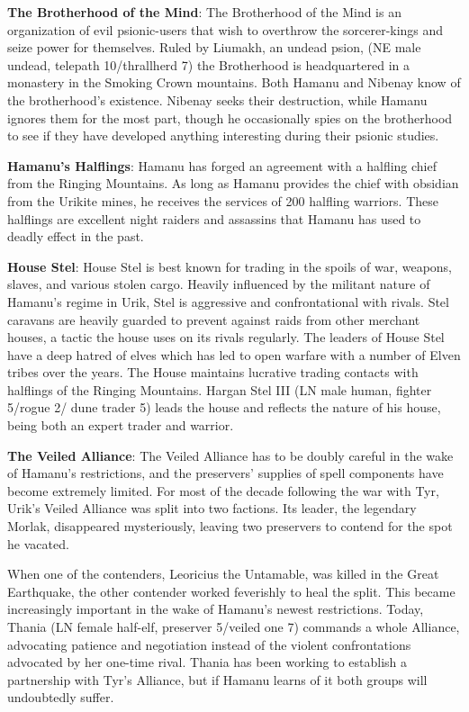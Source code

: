 {
	\textbf{The Brotherhood of the Mind}: The Brotherhood of the Mind is an organization of evil psionic-users that wish to overthrow the sorcerer-kings and seize power for themselves. Ruled by Liumakh, an undead psion, (NE male undead, telepath 10/thrallherd 7) the Brotherhood is headquartered in a monastery in the Smoking Crown mountains. Both Hamanu and Nibenay know of the brotherhood's existence. Nibenay seeks their destruction, while Hamanu ignores them for the most part, though he occasionally spies on the brotherhood to see if they have developed anything interesting during their psionic studies.

	\textbf{Hamanu's Halflings}: Hamanu has forged an agreement with a halfling chief from the Ringing Mountains. As long as Hamanu provides the chief with obsidian from the Urikite mines, he receives the services of 200 halfling warriors. These halflings are excellent night raiders and assassins that Hamanu has used to deadly effect in the past.

	\textbf{House Stel}: House Stel is best known for trading in the spoils of war, weapons, slaves, and various stolen cargo. Heavily influenced by the militant nature of Hamanu's regime in Urik, Stel is aggressive and confrontational with rivals. Stel caravans are heavily guarded to prevent against raids from other merchant houses, a tactic the house uses on its rivals regularly. The leaders of House Stel have a deep hatred of elves which has led to open warfare with a number of Elven tribes over the years. The House maintains lucrative trading contacts with halflings of the Ringing Mountains. Hargan Stel III (LN male human, fighter 5/rogue 2/ dune trader 5) leads the house and reflects the nature of his house, being both an expert trader and warrior.

	\textbf{The Veiled Alliance}: The Veiled Alliance has to be doubly careful in the wake of Hamanu's restrictions, and the preservers' supplies of spell components have become extremely limited. For most of the decade following the war with Tyr, Urik's Veiled Alliance was split into two factions. Its leader, the legendary Morlak, disappeared mysteriously, leaving two preservers to contend for the spot he vacated.

	When one of the contenders, Leoricius the Untamable, was killed in the Great Earthquake, the other contender worked feverishly to heal the split. This became increasingly important in the wake of Hamanu's newest restrictions. Today, Thania (LN female half-elf, preserver 5/veiled one 7) commands a whole Alliance, advocating patience and negotiation instead of the violent confrontations advocated by her one-time rival. Thania has been working to establish a partnership with Tyr's Alliance, but if Hamanu learns of it both groups will undoubtedly suffer.
}
